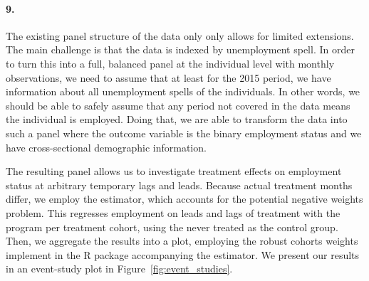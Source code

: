 \documentclass{scrartcl}
\begin{document}
\paragraph*{9.}

The existing panel structure of the data only only allows for limited extensions. The main challenge is that the data is indexed by unemployment spell. In order to turn this into a full, balanced panel at the individual level with monthly observations, we need to assume that at least for the 2015 period, we have information about all unemployment spells of the individuals. In other words, we should be able to safely assume that any period not covered in the data means the individual is employed. Doing that, we are able to transform the data into such a panel where the outcome variable is the binary employment status and we have cross-sectional demographic information.

The resulting panel allows us to investigate treatment effects on employment status at arbitrary temporary lags and leads. Because actual treatment months differ, we employ the \cite{callawayDifferenceinDifferencesMultipleTime2020} estimator, which accounts for the potential negative weights problem. This regresses employment on leads and lags of treatment with the program per treatment cohort, using the never treated as the control group. Then, we aggregate the results into a plot, employing the robust cohorts weights implement in the R package accompanying the estimator. We present our results in an event-study plot in Figure~\ref{fig:event_studies}.
\end{document}
